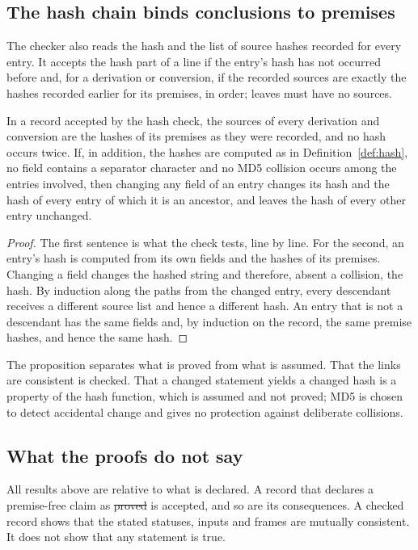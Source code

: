 \subsection{The hash chain binds conclusions to premises}

The checker also reads the hash and the list of source hashes recorded for every entry. It accepts the hash part of a line if the
entry's hash has not occurred before and, for a derivation or conversion, if the recorded sources are exactly the hashes recorded
earlier for its premises, in order; leaves must have no sources.

\begin{proposition}\label{prop:links}
In a record accepted by the hash check, the sources of every derivation and conversion are the hashes of its premises as they were
recorded, and no hash occurs twice. If, in addition, the hashes are computed as in Definition~\ref{def:hash}, no field contains a separator character and no MD5 collision
occurs among the entries involved, then changing any field of an entry changes its hash and the hash of every entry of which it is an
ancestor, and leaves the hash of every other entry unchanged.
\end{proposition}

\begin{proof}
The first sentence is what the check tests, line by line. For the second, an entry's hash is computed from its own fields and the
hashes of its premises. Changing a field changes the hashed string and therefore, absent a collision, the hash. By induction along the
paths from the changed entry, every descendant receives a different source list and hence a different hash. An entry that is not a
descendant has the same fields and, by induction on the record, the same premise hashes, and hence the same hash.
\end{proof}

The proposition separates what is proved from what is assumed. That the links are consistent is checked. That a changed statement
yields a changed hash is a property of the hash function, which is assumed and not proved; MD5 is chosen to detect accidental change
and gives no protection against deliberate collisions.

\subsection{What the proofs do not say}

All results above are relative to what is declared. A record that declares a premise-free claim as \st{proved} is accepted, and so are
its consequences. A checked record shows that the stated statuses, inputs and frames are mutually consistent. It does not show that
any statement is true.
